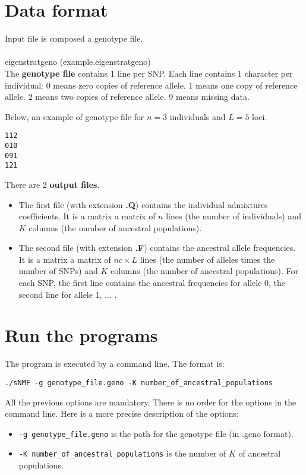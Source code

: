 \documentclass[10pt,a4paper]{article}
\begin{document}
\section{Data format}

Input file is composed a genotype file. 
\\
\\
eigenstratgeno (example.eigenstratgeno)\\
The {\bf genotype file} contains 1 line per SNP.
  Each line contains 1 character per individual:
  0 means zero copies of reference allele.
  1 means one copy of reference allele.
  2 means two copies of reference allele.
  9 means missing data.

Below, an example of genotype file for $n=3$ individuals and $L=5$ loci.
\begin{center}
\footnotesize
\begin{Verbatim}[frame=single]
112
010
091
121
\end{Verbatim}
\end{center}

\noindent
There are 2 {\bf output files}.

\begin{itemize}
\item The first file (with extension {\bf .Q}) contains the individual admixtures coefficients.
It is a matrix a matrix of $n$ lines (the number of individuals) and $K$ columns (the 
number of ancestral populations).
\item The second file (with extension {\bf .F}) contains the ancestral allele frequencies.
It is a matrix a matrix of $nc\times L$ lines (the number of alleles times the number of SNPs) and $K$ columns (the 
number of ancestral populations). For each SNP, the first line contains the ancestral frequencies for allele 0, the second line for allele 1, ... .
\end{itemize}

\section{Run the programs}
The program is executed by a command line. The format is:
\begin{Verbatim}[frame=single]
./sNMF -g genotype_file.geno -K number_of_ancestral_populations 
\end{Verbatim}

\noindent
All the previous options are mandatory. There is no order for the options in the command line. 
Here is a more precise description of the options:
\begin{itemize}
\item \verb|-g genotype_file.geno| is the path for the genotype file (in .geno format).
\item \verb|-K number_of_ancestral_populations| is the number of $K$ of ancestral populations. 
\end{itemize}
\end{document}
